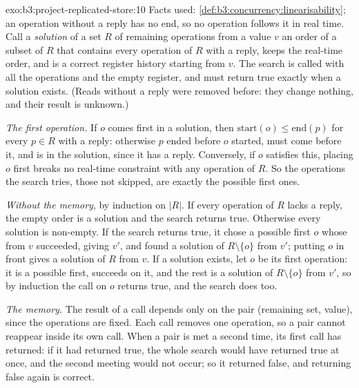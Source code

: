 \begin{solution}{exo:b3:project-replicated-store:10}
Facts used: \cref{def:b3:concurrency:linearisability}; an operation without a reply has no end, so no operation follows it in real time. Call a \emph{solution} of a set $R$ of remaining operations from a value $v$ an order of a subset of $R$ that contains every operation of $R$ with a reply, keeps the real-time order, and is a correct register history starting from $v$. The search is called with all the operations and the empty register, and must return true exactly when a solution exists. (Reads without a reply were removed before: they change nothing, and their result is unknown.)

\emph{The first operation.} If $o$ comes first in a solution, then $\mathrm{start}(o) \leq \mathrm{end}(p)$ for every $p \in R$ with a reply: otherwise $p$ ended before $o$ started, must come before it, and is in the solution, since it has a reply. Conversely, if $o$ satisfies this, placing $o$ first breaks no real-time constraint with any operation of $R$. So the operations the search tries, those not skipped, are exactly the possible first ones.

\emph{Without the memory}, by induction on $|R|$. If every operation of $R$ lacks a reply, the empty order is a solution and the search returns true. Otherwise every solution is non-empty. If the search returns true, it chose a possible first $o$ whose  from $v$ succeeded, giving $v'$, and found a solution of $R \setminus \{o\}$ from $v'$; putting $o$ in front gives a solution of $R$ from $v$. If a solution exists, let $o$ be its first operation: it is a possible first,  succeeds on it, and the rest is a solution of $R \setminus \{o\}$ from $v'$, so by induction the call on $o$ returns true, and the search does too.

\emph{The memory.} The result of a call depends only on the pair (remaining set, value), since the operations are fixed. Each call removes one operation, so a pair cannot reappear inside its own call. When a pair is met a second time, its first call has returned: if it had returned true, the whole search would have returned true at once, and the second meeting would not occur; so it returned false, and returning false again is correct.
\end{solution}

